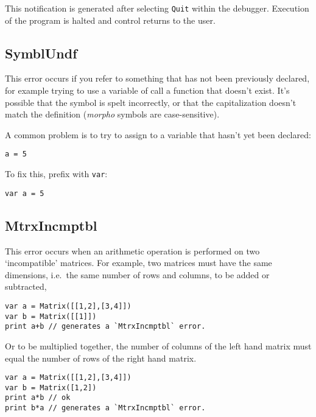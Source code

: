 This notification is generated after selecting \texttt{Quit} within the
debugger. Execution of the program is halted and control returns to the
user.

\hypertarget{symblundf}{%
\subsection{SymblUndf}\label{symblundf}}

This error occurs if you refer to something that has not been previously
declared, for example trying to use a variable of call a function that
doesn't exist. It's possible that the symbol is spelt incorrectly, or
that the capitalization doesn't match the definition (\emph{morpho}
symbols are case-sensitive).

A common problem is to try to assign to a variable that hasn't yet been
declared:

\begin{lstlisting}
a = 5
\end{lstlisting}

To fix this, prefix with \texttt{var}:

\begin{lstlisting}
var a = 5
\end{lstlisting}

\hypertarget{mtrxincmptbl}{%
\subsection{MtrxIncmptbl}\label{mtrxincmptbl}}

This error occurs when an arithmetic operation is performed on two
`incompatible' matrices. For example, two matrices must have the same
dimensions, i.e.~the same number of rows and columns, to be added or
subtracted,

\begin{lstlisting}
var a = Matrix([[1,2],[3,4]])
var b = Matrix([[1]])
print a+b // generates a `MtrxIncmptbl` error.
\end{lstlisting}

Or to be multiplied together, the number of columns of the left hand
matrix must equal the number of rows of the right hand matrix.

\begin{lstlisting}
var a = Matrix([[1,2],[3,4]])
var b = Matrix([1,2])
print a*b // ok
print b*a // generates a `MtrxIncmptbl` error.
\end{lstlisting}
